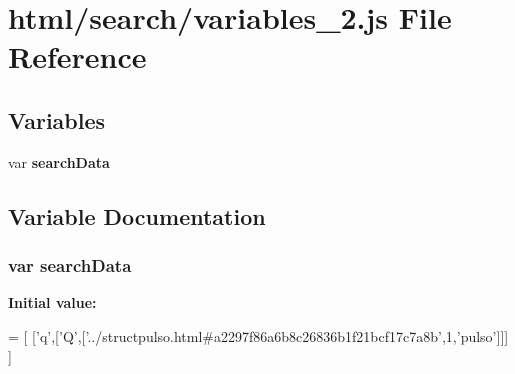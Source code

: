 \section{html/search/variables\+\_\+2.js File Reference}
\label{variables__2_8js}
\subsection*{Variables}
\begin{DoxyCompactItemize}
\item 
var {\bf search\+Data}
\end{DoxyCompactItemize}


\subsection{Variable Documentation}
\subsubsection[{search\+Data}]{\setlength{\rightskip}{0pt plus 5cm}var search\+Data}\label{variables__2_8js_ad01a7523f103d6242ef9b0451861231e}
{\bfseries Initial value\+:}
\begin{DoxyCode}
=
[
  [\textcolor{charliteral}{'q'},[\textcolor{charliteral}{'Q'},[\textcolor{stringliteral}{'../structpulso.html#a2297f86a6b8c26836b1f21bcf17c7a8b'},1,\textcolor{stringliteral}{'pulso'}]]]
]
\end{DoxyCode}

